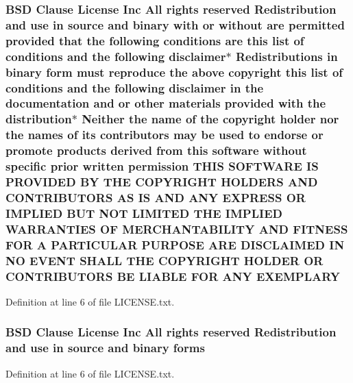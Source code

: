 \subsubsection[{\texorpdfstring{E\+X\+E\+M\+P\+L\+A\+RY}{EXEMPLARY}}]{\setlength{\rightskip}{0pt plus 5cm}B\+SD Clause License Inc All rights reserved Redistribution and use in source and binary with or without are permitted provided that the following conditions are this list of conditions and the following disclaimer$\ast$ Redistributions in binary form must reproduce the above copyright this list of conditions and the following disclaimer in the documentation and or other materials provided with the distribution$\ast$ Neither the name of the copyright holder nor the names of its contributors may be used to endorse or promote products derived from this software without specific prior written permission T\+H\+IS S\+O\+F\+T\+W\+A\+RE IS P\+R\+O\+V\+I\+D\+ED BY T\+HE C\+O\+P\+Y\+R\+I\+G\+HT H\+O\+L\+D\+E\+RS A\+ND C\+O\+N\+T\+R\+I\+B\+U\+T\+O\+RS AS IS A\+ND A\+NY E\+X\+P\+R\+E\+SS OR I\+M\+P\+L\+I\+ED B\+UT N\+OT L\+I\+M\+I\+T\+ED T\+HE I\+M\+P\+L\+I\+ED {\bf W\+A\+R\+R\+A\+N\+T\+I\+ES} OF M\+E\+R\+C\+H\+A\+N\+T\+A\+B\+I\+L\+I\+TY A\+ND F\+I\+T\+N\+E\+SS F\+OR A P\+A\+R\+T\+I\+C\+U\+L\+AR P\+U\+R\+P\+O\+SE A\+RE D\+I\+S\+C\+L\+A\+I\+M\+ED IN NO E\+V\+E\+NT S\+H\+A\+LL T\+HE C\+O\+P\+Y\+R\+I\+G\+HT H\+O\+L\+D\+ER OR C\+O\+N\+T\+R\+I\+B\+U\+T\+O\+RS BE L\+I\+A\+B\+LE F\+OR A\+NY E\+X\+E\+M\+P\+L\+A\+RY}\hypertarget{LICENSE_8txt_a43c88664011ec4ec9fd41f9050dd8ffe}{}\label{LICENSE_8txt_a43c88664011ec4ec9fd41f9050dd8ffe}


Definition at line 6 of file L\+I\+C\+E\+N\+S\+E.\+txt.

\subsubsection[{\texorpdfstring{forms}{forms}}]{\setlength{\rightskip}{0pt plus 5cm}B\+SD Clause License Inc All rights reserved Redistribution and use in source and binary forms}\hypertarget{LICENSE_8txt_a0a1fef0f3174b6df470895054ed01e51}{}\label{LICENSE_8txt_a0a1fef0f3174b6df470895054ed01e51}


Definition at line 6 of file L\+I\+C\+E\+N\+S\+E.\+txt.

